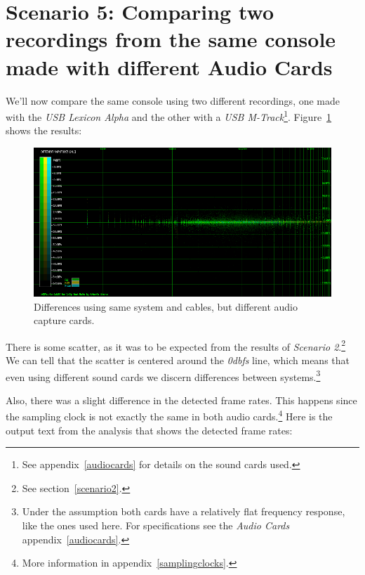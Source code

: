 \documentclass[10pt,a4paper]{report}
\newcommand{\db}[1]{\textit{\mbox{#1\acrshort{dbfs}}}}
\begin{document}
\section{Scenario 5: Comparing two recordings from the same console made with different Audio Cards}

We'll now compare the same console using two different recordings, one made with the \textit{USB Lexicon Alpha} and the other with a \textit{USB M-Track}\footnote{See appendix~\ref{audiocards} for details on the sound cards used.}. Figure~\ref{fig:plot5-1-all} shows the results:

\begin{figure}[H]
	\centering
	\includegraphics[width=1.0\linewidth]{images/interpretation/Plot5-1-All.png}
	\caption[Different sound cards]{Differences using same system and cables, but different audio capture cards.}
	\label{fig:plot5-1-all}
\end{figure}

There is some scatter, as it was to be expected from the results of \textit{Scenario 2}.\footnote{See section~\ref{scenario2}.} We can tell that the scatter is centered around the \db{0} line, which means that even using different sound cards we discern differences between systems.\footnote{Under the assumption both cards have a relatively flat frequency response, like the ones used here. For specifications see the \textit{Audio Cards} appendix~\ref{audiocards}.}

Also, there was a slight difference in the detected frame rates. This happens since the sampling clock is not exactly the same in both audio cards.\footnote{More information in appendix~\ref{samplingclocks}.} Here is the output text from the analysis that shows the detected frame rates:
\end{document}
